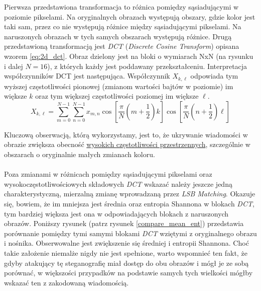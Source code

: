        Pierwsza przedstawiona transformacja to różnica pomiędzy sąsiadującymi w poziomie pikselami. Na oryginalnych obrazach występują obszary, gdzie kolor jest taki sam, przez co nie występują różnice między sąsiadującymi pikselami. Na naruszonych obrazach w tych samych obszarach występują różnice. Drugą przedstawioną transformacją jest \textit{DCT} (\textit{Discrete Cosine Transform}) opisana wzorem \ref{eq:2d_dct}. Obraz dzielony jest na bloki o wymiarach NxN (na rysunku i dalej $N=16$), z których każdy jest poddawany przekształceniu. Interpretacja współczynników DCT jest następująca. Współczynnik $X_{k,\ell}$ odpowiada tym wyższej częstotliwości pionowej (zmianom wartości bajtów w poziomie) im większe $k$ oraz tym większej częstotliwości poziomej im większe $\ell$.
        \begin{equation}
            X_{k,\ell} = \sum_{m=0}^{N-1} \sum_{n=0}^{N-1} x_{m,n} \cos \left[ \frac{\pi}{N} \left(m + \frac{1}{2}\right) k \right] \cos \left[ \frac{\pi}{N} \left(n + \frac{1}{2}\right) \ell \right]
        \label{eq:2d_dct}
        \end{equation}

        Kluczową obserwacją, którą wykorzystamy, jest to, że ukrywanie wiadomości w obrazie zwiększa obecność \underline{wysokich częstotliwości przestrzennych}, szczególnie w obszarach o oryginalnie małych zmianach koloru. \\
        \\
        Poza zmianami w różnicach pomiędzy sąsiadującymi pikselami oraz wysokoczęstotliwościowych składowych \textit{DCT} wskazać należy jeszcze jedną charakterystyczną, mierzalną zmianę wprowadzaną przez \textit{LSB Matching}. Okazuje się, bowiem, że im mniejsza jest średnia oraz entropia Shannona w blokach \textit{DCT}, tym bardziej większa jest ona w odpowiadających blokach z naruszonych obrazów. Poniższy rysunek (patrz rysunek \ref{compare_mean_ent}) przedstawia porównanie pomiędzy tymi samymi blokami \textit{DCT} wziętymi z oryginalnego obrazu i nośnika. Obserwowalne jest zwiększenie się średniej i entropii Shannona. Choć takie założenie niemalże nigdy nie jest spełnione, warto wspomnieć ten fakt, że gdyby atakujący tę steganografię miał dostęp do obu obrazów i mógł je ze sobą porównać, w większości przypadków na podstawie samych tych wielkości mógłby wskazać ten z zakodowaną wiadomością.

